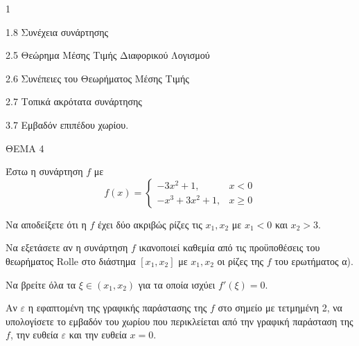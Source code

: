 \begin{ylh}{1}
    \item 1.8 Συνέχεια συνάρτησης
    \item 2.5 Θεώρημα Μέσης Τιμής Διαφορικού Λογισμού
    \item 2.6 Συνέπειες του Θεωρήματος Μέσης Τιμής
    \item 2.7 Τοπικά ακρότατα συνάρτησης
    \item 3.7 Εμβαδόν επιπέδου χωρίου.
\end{ylh}
ΘΕΜΑ 4

Έστω η συνάρτηση $f$ με
\[ f(x) = \begin{cases} -3x^2 + 1, & x < 0 \\ -x^3 + 3x^2 + 1, & x \ge 0 \end{cases} \]
\begin{alist}
\item Να αποδείξετε ότι η $f$ έχει δύο ακριβώς ρίζες τις $x_1, x_2$ με $x_1 < 0$ και $x_2 > 3$. 
\item
    \begin{rlist}
    \item Να εξετάσετε αν η συνάρτηση $f$ ικανοποιεί καθεμία από τις προϋποθέσεις του θεωρήματος Rolle στο διάστημα $[x_1, x_2]$ με $x_1, x_2$ οι ρίζες της $f$ του ερωτήματος α). 
    \item Να βρείτε όλα τα $\xi \in (x_1, x_2)$ για τα οποία ισχύει $f'(\xi) = 0$. 
    \end{rlist}
\item Αν $\varepsilon$ η εφαπτομένη της γραφικής παράστασης της $f$ στο σημείο με τετμημένη 2, να υπολογίσετε το εμβαδόν του χωρίου που περικλείεται από την γραφική παράσταση της $f$, την ευθεία $\varepsilon$ και την ευθεία $x=0$. 
\end{alist}